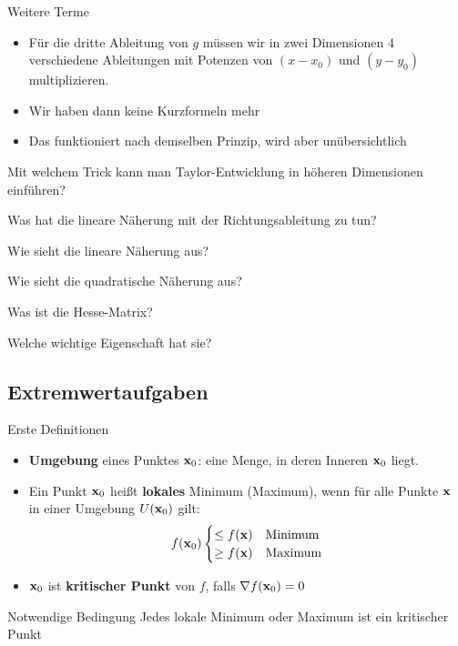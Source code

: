 \begin{frame}{Weitere Terme}
  \begin{itemize}
  \item Für die dritte Ableitung von $g$ müssen wir in zwei
    Dimensionen 4 verschiedene Ableitungen mit Potenzen von $(x-x_0)$
    und $(y-y_0)$ multiplizieren.
  \item Wir haben dann keine Kurzformeln mehr
  \item Das funktioniert nach demselben Prinzip, wird aber
    unübersichtlich
  \end{itemize}
\end{frame}

\begin{Abschluss}
\item Mit welchem \glqq{}Trick\grqq{} kann man Taylor-Entwicklung in
  höheren Dimensionen einführen?
\item Was hat die lineare Näherung mit der Richtungsableitung zu tun?
\item Wie sieht die lineare Näherung aus?
\item Wie sieht die quadratische Näherung aus?
\item Was ist die Hesse-Matrix?
\item Welche wichtige Eigenschaft hat sie?
\end{Abschluss}

\subsection{Extremwertaufgaben}

\begin{frame}{Erste Definitionen}
  \begin{itemize}
  \item \textbf{Umgebung} eines Punktes $\mathbf{x}_0$: eine Menge, in deren Inneren $\mathbf{x}_0$ liegt.
  \item Ein Punkt $\mathbf{x}_0$ heißt \textbf{lokales} Minimum (Maximum), wenn für
    alle Punkte $\mathbf{x}$ in einer Umgebung $U(\mathbf{x}_0)$ gilt:
    \begin{gather*}
      f(\mathbf{x}_0)
      \begin{cases}
        \le f(\mathbf{x})&\text{Minimum} \\
        \ge f(\mathbf{x})&\text{Maximum}
      \end{cases}
    \end{gather*}
  \item $\mathbf{x}_0$ ist \textbf{kritischer Punkt} von $f$, falls $\nabla f(\mathbf{x}_0) = 0$
  \end{itemize}
  \begin{block}{Notwendige Bedingung}
    Jedes lokale Minimum oder Maximum ist ein kritischer Punkt
  \end{block}
\end{frame}

